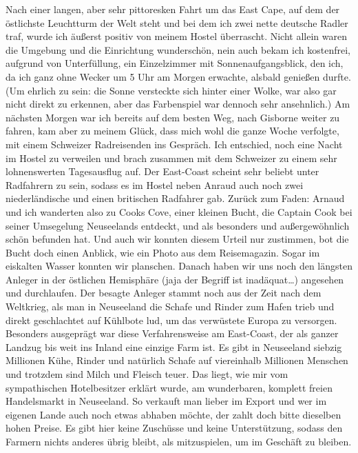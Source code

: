 Nach einer langen, aber sehr pittoresken Fahrt um das East Cape, auf dem
der östlichste Leuchtturm der Welt steht und bei dem ich zwei nette
deutsche Radler traf, wurde ich äußerst positiv von meinem Hostel
überrascht. Nicht allein waren die Umgebung und die Einrichtung
wunderschön, nein auch bekam ich kostenfrei, aufgrund von Unterfüllung,
ein Einzelzimmer mit Sonnenaufgangsblick, den ich, da ich ganz ohne
Wecker um 5 Uhr am Morgen erwachte, alsbald genießen durfte. (Um ehrlich
zu sein: die Sonne versteckte sich hinter einer Wolke, war also gar
nicht direkt zu erkennen, aber das Farbenspiel war dennoch sehr
ansehnlich.) Am nächsten Morgen war ich bereits auf dem besten Weg, nach
Gisborne weiter zu fahren, kam aber zu meinem Glück, dass mich wohl die
ganze Woche verfolgte, mit einem Schweizer Radreisenden ins Gespräch.
Ich entschied, noch eine Nacht im Hostel zu verweilen und brach zusammen
mit dem Schweizer zu einem sehr lohnenswerten Tagesausflug auf. Der
East-Coast scheint sehr beliebt unter Radfahrern zu sein, sodass es im
Hostel neben Anraud auch noch zwei niederländische und einen britischen
Radfahrer gab. Zurück zum Faden: Arnaud und ich wanderten also zu Cooks
Cove, einer kleinen Bucht, die Captain Cook bei seiner Umsegelung
Neuseelands entdeckt, und als besonders und außergewöhnlich schön
befunden hat. Und auch wir konnten diesem Urteil nur zustimmen, bot die
Bucht doch einen Anblick, wie ein Photo aus dem Reisemagazin. Sogar im
eiskalten Wasser konnten wir planschen. Danach haben wir uns noch den
längsten Anleger in der östlichen Hemisphäre (jaja der Begriff ist
inadäquat\ldots) angesehen und durchlaufen. Der besagte Anleger stammt
noch aus der Zeit nach dem Weltkrieg, als man in Neuseeland die Schafe
und Rinder zum Hafen trieb und direkt geschlachtet auf Kühlbote lud, um
das verwüstete Europa zu versorgen. Besonders ausgeprägt war diese
Verfahrensweise am East-Coast, der als ganzer Landzug bis weit ins
Inland eine einzige Farm ist. Es gibt in Neuseeland siebzig Millionen
Kühe, Rinder und natürlich Schafe auf viereinhalb Millionen Menschen und
trotzdem sind Milch und Fleisch teuer. Das liegt, wie mir vom
sympathischen Hotelbesitzer erklärt wurde, am wunderbaren, komplett
freien Handelsmarkt in Neuseeland. So verkauft man lieber im Export und
wer im eigenen Lande auch noch etwas abhaben möchte, der zahlt doch
bitte dieselben hohen Preise. Es gibt hier keine Zuschüsse und keine
Unterstützung, sodass den Farmern nichts anderes übrig bleibt, als
mitzuspielen, um im Geschäft zu bleiben.

